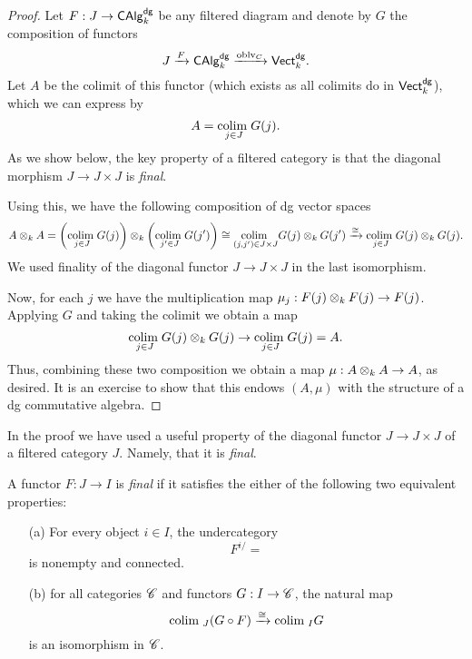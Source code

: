 \documentclass[11pt]{amsart}
\def\colim{{\rm colim}\;}
\begin{document}
\begin{proof}
Let $F : J \to {\sf CAlg}^{\sf dg}_k$ be any filtered diagram and denote by $G$ the composition of functors
\[
J \xrightarrow{F} {\sf CAlg}^{\sf dg}_k \xrightarrow{{\rm oblv}_C} {\sf Vect}^{\sf dg}_k .
\]
Let $A$ be the colimit of this functor (which exists as all colimits do in ${\sf Vect}^{\sf dg}_k$), which we can express by
\[
A = \underset{j \in J}{\colim} G(j) .
\] 
As we show below, the key property of a filtered category is that the diagonal morphism $J \to J \times J$ is {\em final}. 

Using this, we have the following composition of dg vector spaces
\[
A \tensor_k A = \left(\underset{j \in J}{\colim} G(j)\right) \tensor_k \left(\underset{j' \in J}{\colim} G(j')\right) \cong \underset{(j,j') \in J\times J}{\colim} G(j) \tensor_k G(j') \xto{\cong} \underset{j \in J}{\colim} G(j) \tensor_k G(j) .
\]
We used finality of the diagonal functor $J \to J \times J$ in the last isomorphism. 

Now, for each $j$ we have the multiplication map $\mu_j : F(j) \otimes_k F(j) \to F(j)$.
Applying $G$ and taking the colimit we obtain a map
\[
\underset{j \in J}{\colim} G(j) \tensor_k G(j) \to \underset{j \in J}{\colim} G(j) = A .
\]
Thus, combining these two composition we obtain a map $\mu : A \otimes_k A \to A$, as desired. 
It is an exercise to show that this endows $(A, \mu)$ with the structure of a dg commutative algebra. 
\end{proof}

In the proof we have used a useful property of the diagonal functor $J \to J \times J$ of a filtered category $J$. 
Namely, that it is {\em final}. 

\begin{dfn}
A functor $F : J \to I$ is {\em final} if it satisfies the either of the following two equivalent properties:
\begin{itemize}
\item[(a)] 
For every object $i \in I$, the undercategory 
\[
F^{i /} =  
\]
is nonempty and connected. 
\item[(b)] for all categories $\mathscr C$ and functors $G : I \to \mathscr C$, the natural map
\[
\colim_{J} (G \circ F) \xto{\cong} \colim_{I} G
\]
is an isomorphism in $\mathscr C$. 
\end{itemize}
\end{dfn}

\subsubsection{}
\end{document}
